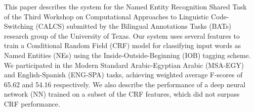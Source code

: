 This paper describes the system for the Named Entity Recognition Shared Task of the Third Workshop on Computational Approaches to Linguistic Code-Switching  (CALCS) submitted by the Bilingual Annotations Tasks (BATs) research group of the University of Texas. Our system uses several features to train a Conditional Random Field (CRF) model for classifying input words as Named Entities (NEs) using the Inside-Outside-Beginning (IOB) tagging scheme. We participated in the Modern Standard Arabic-Egyptian Arabic (MSA-EGY) and English-Spanish (ENG-SPA) tasks, achieving weighted average F-scores of 65.62 and 54.16 respectively. We also describe the performance of a deep neural network (NN) trained on a subset of the CRF features, which did not surpass CRF performance.
